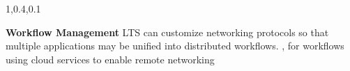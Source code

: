 \begin{frame}{}
{\begin{minipage}{1.08\textwidth}
\begin{lightquadblockc}{1,0.4,0.1}
\begin{minipage}{1.07\textwidth}
{\begin{enumerate}
\dmitem \textbf{Workflow Management}  \hspace{.5em} 
LTS can customize networking 
protocols so that multiple applications may be 
unified into distributed workflows.
{\color[rgb]{0.3,0,0.1}{(dev: \$50K; licensing: \$15K/month}}, 
for workflows using cloud services 
to enable remote networking{\color[rgb]{0.3,0,0.1}{)}}

\end{enumerate}
}\end{minipage}
\end{lightquadblockc}
\end{minipage}

}

\end{frame}
